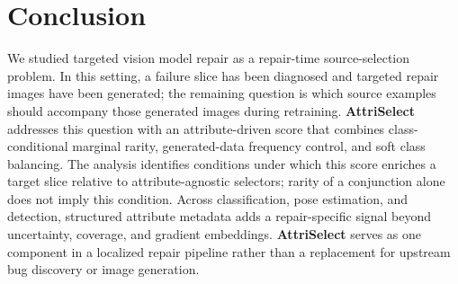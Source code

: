 \documentclass[10pt,twocolumn,letterpaper]{article}
\newcommand{\modelname}{AttriSelect}
\newcommand{\model}{\textcolor{darkteal}{\textbf{\modelname}}\xspace}
\begin{document}

\section{Conclusion}

We studied targeted vision model repair as a repair-time source-selection problem. In this setting, a failure slice has been diagnosed and targeted repair images have been generated; the remaining question is which source examples should accompany those generated images during retraining. \model addresses this question with an attribute-driven score that combines class-conditional marginal rarity, generated-data frequency control, and soft class balancing. The analysis identifies conditions under which this score enriches a target slice relative to attribute-agnostic selectors; rarity of a conjunction alone does not imply this condition. Across classification, pose estimation, and detection, structured attribute metadata adds a repair-specific signal beyond uncertainty, coverage, and gradient embeddings. \model serves as one component in a localized repair pipeline rather than a replacement for upstream bug discovery or image generation.

\end{document}
